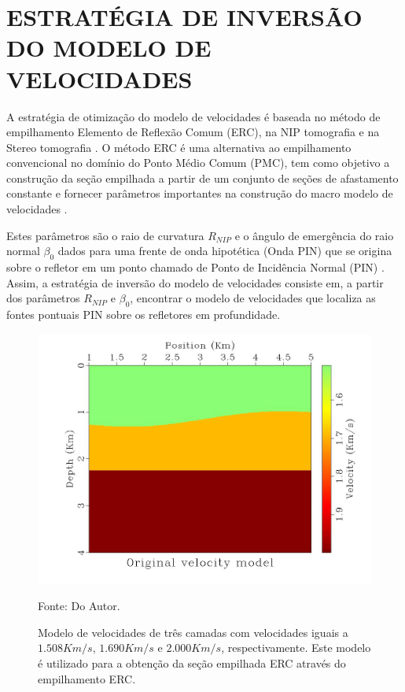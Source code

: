\chapter{ESTRATÉGIA DE INVERSÃO DO MODELO DE VELOCIDADES}
\label{cap9}

A estratégia de otimização do modelo de velocidades é baseada no método de empilhamento Elemento de Reflexão Comum (ERC), na NIP tomografia \cite{niptomo} e na Stereo tomografia \cite{stereo}.
O método ERC é uma alternativa ao empilhamento convencional no domínio do Ponto Médio Comum (PMC), tem como
objetivo a construção da seção empilhada a partir de um conjunto de seções de afastamento constante e
fornecer parâmetros importantes na construção do macro modelo de velocidades \cite{cre}.

Estes parâmetros são o raio de curvatura $R_{NIP}$ e o ângulo de emergência do raio normal $\beta_0$ dados para
uma frente de onda hipotética (Onda PIN) que se origina sobre o refletor em um ponto chamado de Ponto de Incidência Normal
(PIN) \cite{hubral}. Assim, a estratégia de inversão do modelo de velocidades consiste em, a partir dos parâmetros $R_{NIP}$ e $\beta_0$, encontrar o modelo de velocidades que localiza as fontes
pontuais PIN sobre os refletores em profundidade.

\begin{figure}[H]
\caption{Modelo de velocidades de três camadas com velocidades iguais a $1.508Km/s$,
$1.690Km/s$ e $2.000Km/s$, respectivamente. Este modelo é utilizado para a obtenção da seção
empilhada ERC através do empilhamento ERC.}
\begin{center}
\includegraphics[scale=0.3]{images/mod1.jpeg}
\vspace{-0.3cm}
\end{center}
\begin{center}
 Fonte: Do Autor.
\end{center}
\label{fig:9.1}
\end{figure}

